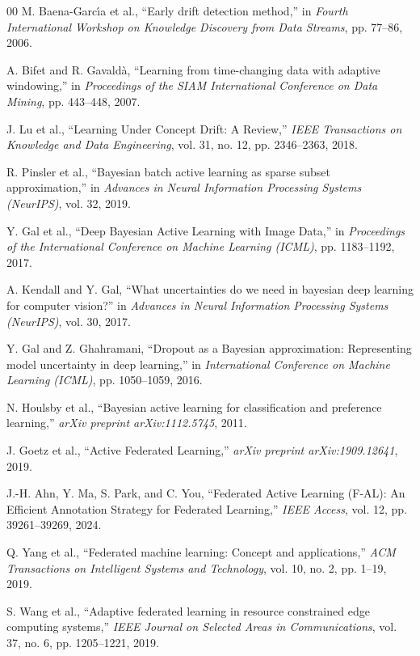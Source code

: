 \documentclass[conference]{IEEEtran}
\begin{document}
\begin{thebibliography}{00}
 M. Baena-Garc{\'\i}a et al., ``Early drift detection method,'' in \textit{Fourth International Workshop on Knowledge Discovery from Data Streams}, pp. 77--86, 2006.

 A. Bifet and R. Gavald{\`a}, ``Learning from time-changing data with adaptive windowing,'' in \textit{Proceedings of the SIAM International Conference on Data Mining}, pp. 443--448, 2007.

 J. Lu et al., ``Learning Under Concept Drift: A Review,'' \textit{IEEE Transactions on Knowledge and Data Engineering}, vol. 31, no. 12, pp. 2346--2363, 2018.

 R. Pinsler et al., ``Bayesian batch active learning as sparse subset approximation,'' in \textit{Advances in Neural Information Processing Systems (NeurIPS)}, vol. 32, 2019.

 Y. Gal et al., ``Deep Bayesian Active Learning with Image Data,'' in \textit{Proceedings of the International Conference on Machine Learning (ICML)}, pp. 1183--1192, 2017.

 A. Kendall and Y. Gal, ``What uncertainties do we need in bayesian deep learning for computer vision?'' in \textit{Advances in Neural Information Processing Systems (NeurIPS)}, vol. 30, 2017.

 Y. Gal and Z. Ghahramani, ``Dropout as a Bayesian approximation: Representing model uncertainty in deep learning,'' in \textit{International Conference on Machine Learning (ICML)}, pp. 1050--1059, 2016.

 N. Houlsby et al., ``Bayesian active learning for classification and preference learning,'' \textit{arXiv preprint arXiv:1112.5745}, 2011.

 J. Goetz et al., ``Active Federated Learning,'' \textit{arXiv preprint arXiv:1909.12641}, 2019.

 J.-H. Ahn, Y. Ma, S. Park, and C. You, ``Federated Active Learning (F-AL): An Efficient Annotation Strategy for Federated Learning,'' \textit{IEEE Access}, vol. 12, pp. 39261--39269, 2024.

 Q. Yang et al., ``Federated machine learning: Concept and applications,'' \textit{ACM Transactions on Intelligent Systems and Technology}, vol. 10, no. 2, pp. 1--19, 2019.

 S. Wang et al., ``Adaptive federated learning in resource constrained edge computing systems,'' \textit{IEEE Journal on Selected Areas in Communications}, vol. 37, no. 6, pp. 1205--1221, 2019.


\end{thebibliography}
\end{document}
